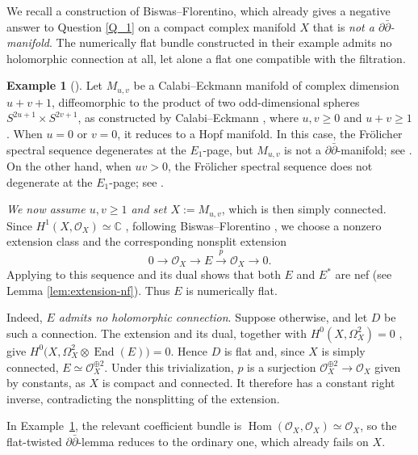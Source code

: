 \documentclass[11pt]{amsart}
\newcommand{\ddbar}{\partial\bar\partial}
\numberwithin{equation}{section}
\theoremstyle{definition}
\newtheorem{example}  [theorem]     {Example}
\theoremstyle{plain}
\theoremstyle{plain}
\theoremstyle{definition}
\theoremstyle{stepstyle}
\begin{document}
	
	
	
	
	\medskip
	We  recall a construction of Biswas--Florentino, 
	which already gives a negative answer to Question \ref{Q_1}
	on a compact complex manifold $X$ that is \textit{not a $\ddbar$-manifold}.
	The numerically flat bundle constructed in their example admits
	no holomorphic connection at all, let alone a flat one compatible
	with the filtration.
	
	\begin{example}[{\cite{BF}}]\label{BF-eg}
		Let $M_{u,v}$ be a Calabi--Eckmann manifold of complex dimension
		$u+v+1$, diffeomorphic to the product of two odd-dimensional spheres
		$S^{2u+1}\times S^{2v+1}$, as constructed by Calabi--Eckmann
		\cite{CE53}, where $u,v\geq0$ and $u+v\geq1$.
		When $u=0$ or $v=0$, it reduces to a Hopf manifold.
		In this case, the Fr\"olicher spectral sequence degenerates at
		the $E_1$-page, but $M_{u,v}$ is not a $\ddbar$-manifold; see \cite[Theorem 3]{Mal91}.
		On the other hand, when $uv>0$, the Fr\"olicher spectral sequence
		does not degenerate at the $E_1$-page; see
		\cite[Remark 4.73]{FOT08}.
		
		\medskip
		\textit{We now assume $u,v\geq1$ and set $X:=M_{u,v}$}, which is then
		simply connected.
		Since $H^1(X,\mathcal O_X)\simeq\mathbb C$ \cite{Hofer},
		following Biswas--Florentino \cite{BF}, we choose a nonzero
		extension class and the corresponding nonsplit extension
		$$
		0\longrightarrow\mathcal O_X
		\longrightarrow E
		\overset{p}{\longrightarrow}\mathcal O_X
		\longrightarrow0.
		$$
		Applying \cite[Proposition 1.15 (ii)]{DPS} to this sequence and
		its dual shows that both $E$ and $E^*$ are nef (see Lemma \ref{lem:extension-nf}).
		Thus $E$ is numerically flat. 
		
		\medskip
		Indeed, \textit{$E$ admits no holomorphic connection}.
		Suppose otherwise, and let $D$ be such a connection.
		The extension and its dual, together with
		$H^0(X,\Omega_X^2)=0$ \cite{Hofer}, give
		$
		H^0\bigl(X,\Omega_X^2\otimes\operatorname{End}(E)\bigr)=0.
		$
		Hence $D$ is flat and, since $X$ is simply connected,
		$E\simeq\mathcal O_X^{\oplus2}$.
		Under this trivialization, $p$ is a surjection
		$\mathcal O_X^{\oplus2}\to\mathcal O_X$ given by constants,
		as $X$ is compact and connected.
		It therefore has a constant right inverse, contradicting
		the nonsplitting of the extension.
	\end{example}
	
	In Example~\ref{BF-eg}, the relevant coefficient bundle is
	$\operatorname{Hom}(\mathcal O_X,\mathcal O_X)\simeq\mathcal O_X$,
	so the flat-twisted $\ddbar$-lemma reduces to the ordinary one,
	which already fails on $X$.
	
\end{document}
